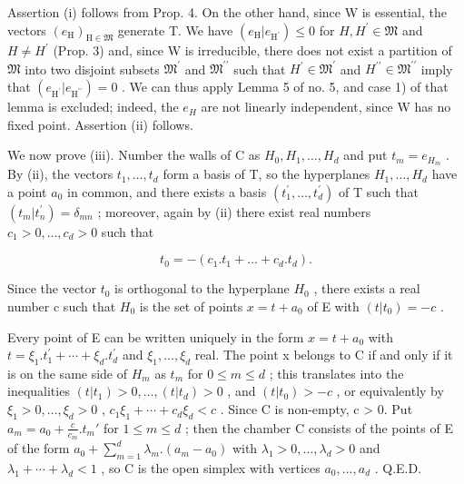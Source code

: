 Assertion (i) follows from Prop. 4. On the other hand, since W is essential, the vectors \((e_{\mathrm{H}})_{\mathrm{H}\in\mathfrak{M}}\) generate T. We have \((e_{\mathrm{H}}|e_{\mathrm{H}^{\prime}})\leqslant0\) for \(H,H^{\prime}\in \mathfrak{M}\) and \(H\neq H^{\prime}\) (Prop. 3) and, since W is irreducible, there does not exist a partition of \(\mathfrak{M}\) into two disjoint subsets \(\mathfrak{M}^{\prime}\) and \(\mathfrak{M}^{\prime\prime}\) such that \(H^{\prime}\in \mathfrak{M}^{\prime}\) and \(H^{\prime\prime}\in \mathfrak{M}^{\prime\prime}\) imply that \((e_{\mathrm{H}^{\prime}}|e_{\mathrm{H}^{\prime\prime}})=0\) . We can thus apply Lemma 5 of no. 5, and case 1) of that lemma is excluded; indeed, the \(e_{H}\) are not linearly independent, since W has no fixed point. Assertion (ii) follows.

We now prove (iii). Number the walls of C as \(H_{0}, H_{1}, \ldots, H_{d}\) and put \(t_{m} = e_{H_{m}}\) . By (ii), the vectors \(t_{1}, \ldots, t_{d}\) form a basis of T, so the hyperplanes \(H_{1}, \ldots, H_{d}\) have a point \(a_{0}\) in common, and there exists a basis \((t_{1}^{\prime}, \ldots, t_{d}^{\prime})\) of T such that \((t_{m}|t_{n}^{\prime}) = \delta_{mn}\) ; moreover, again by (ii) there exist real numbers \(c_{1} > 0, \ldots, c_{d} > 0\) such that

\[
t _ {0} = - \left(c _ {1}. t _ {1} + \dots + c _ {d}. t _ {d}\right).
\]

Since the vector \(t_{0}\) is orthogonal to the hyperplane \(H_{0}\) , there exists a real number c such that \(H_{0}\) is the set of points \(x = t + a_{0}\) of E with \((t|t_{0}) = -c\) .

Every point of E can be written uniquely in the form \(x = t + a_{0}\) with \(t = \xi_{1}.t_{1}^{\prime} + \cdots + \xi_{d}.t_{d}^{\prime}\) and \(\xi_{1}, \ldots, \xi_{d}\) real. The point x belongs to C if and only if it is on the same side of \(H_{m}\) as \(t_{m}\) for \(0 \leqslant m \leqslant d\) ; this translates into the inequalities \((t|t_{1}) > 0, \ldots, (t|t_{d}) > 0\) , and \((t|t_{0}) > -c\) , or equivalently by \(\xi_{1} > 0, \ldots, \xi_{d} > 0\) , \(c_{1}\xi_{1} + \cdots + c_{d}\xi_{d} < c\) . Since C is non-empty, c \textgreater{} 0. Put \(a_{m} = a_{0} + \frac{c}{c_{m}}.t_{m}'\) for \(1 \leqslant m \leqslant d\) ; then the chamber C consists of the points of E of the form \(a_{0} + \sum_{m=1}^{d} \lambda_{m}.(a_{m} - a_{0})\) with \(\lambda_{1} > 0, \ldots, \lambda_{d} > 0\) and \(\lambda_{1} + \cdots + \lambda_{d} < 1\) , so C is the open simplex with vertices \(a_{0}, \ldots, a_{d}\) . Q.E.D.


